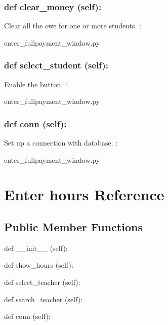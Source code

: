 \hypertarget{class_poly_a14a7ad77ce612b0c54f531d307ee4b39}{
\subsubsection[{def clear_money (self):}]{\setlength{\rightskip}{0pt plus 5cm}def {clear\_money} (self):}}\label{class_poly_a14a7ad77ce612b0c54f531d307ee4b39}
Clear all the owe for one or more students. 
:\begin{DoxyCompactItemize}
\item 
enter\_fullpayment\_window.\-py\end{DoxyCompactItemize}

\hypertarget{class_poly_a14a7ad77ce612b0c54f531d307ee4b39}{
\subsubsection[{def select_student (self):}]{\setlength{\rightskip}{0pt plus 5cm}def {select\_student} (self):}}\label{class_poly_a14a7ad77ce612b0c54f531d307ee4b39}
Enable the button.
:\begin{DoxyCompactItemize}
\item 
enter\_fullpayment\_window.\-py\end{DoxyCompactItemize}

\hypertarget{class_poly_a14a7ad77ce612b0c54f531d307ee4b39}{
\subsubsection[{def conn (self):}]{\setlength{\rightskip}{0pt plus 5cm}def {conn} (self):}}\label{class_poly_a14a7ad77ce612b0c54f531d307ee4b39}
Set up a connection with database.
:\begin{DoxyCompactItemize}
\item 
enter\_fullpayment\_window.\-py\end{DoxyCompactItemize}

\hypertarget{Enter_hours}{\section{Enter hours Reference}
\label{Enter_hours}
}
\subsection*{Public Member Functions}
\begin{DoxyCompactItemize}
\item 
def {\_\_init\_\_} (self):
\item 
def {show\_hours} (self):
\item 
def {select\_teacher} (self):
\item 
def {search\_teacher} (self):
\item 
def {conn} (self):
\end{DoxyCompactItemize}

